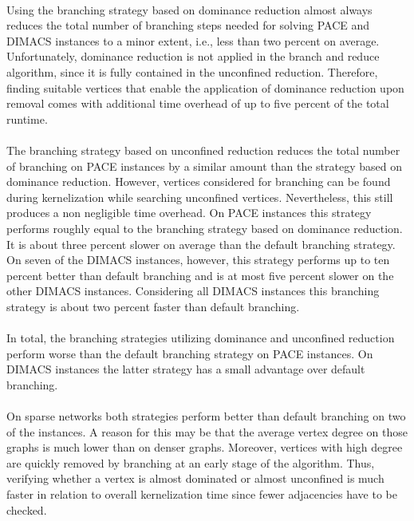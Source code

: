 \documentclass[12pt,a4paper,twoside]{scrartcl}
\numberwithin{equation}{section}
\begin{document}
\paragraph{}
Using the branching strategy based on dominance reduction almost always reduces the total number of branching steps needed for solving PACE and DIMACS instances to a minor extent, i.e., less than two percent on average. Unfortunately, dominance reduction is not applied in the branch and reduce algorithm, since it is fully contained in the unconfined reduction. Therefore, finding suitable vertices that enable the application of dominance reduction upon removal comes with additional time overhead of up to five percent of the total runtime. 

\paragraph{}
The branching strategy based on unconfined reduction reduces the total number of branching on PACE instances by a similar amount than the strategy based on dominance reduction. However, vertices considered for branching can be found during kernelization while searching unconfined vertices. Nevertheless, this still produces a non negligible time overhead. On PACE instances this strategy performs roughly equal to the branching strategy based on dominance reduction. It is about three percent slower on average than the default branching strategy. On seven of the DIMACS instances, however, this strategy performs up to ten percent better than default branching and is at most five percent slower on the other DIMACS instances. Considering all DIMACS instances this branching strategy is about two percent faster than default branching.
\paragraph{}
In total, the branching strategies utilizing dominance and unconfined reduction perform worse than the default branching strategy on PACE instances. On DIMACS instances the latter strategy has a small advantage over default branching.
\paragraph{}
On sparse networks both strategies perform better than default branching on two of the instances. A reason for this may be that the average vertex degree on those graphs is much lower than on denser graphs. Moreover, vertices with high degree are quickly removed by branching at an early stage of the algorithm. Thus, verifying whether a vertex is almost dominated or almost unconfined is much faster in relation to overall kernelization time since fewer adjacencies have to be checked.
\end{document}
